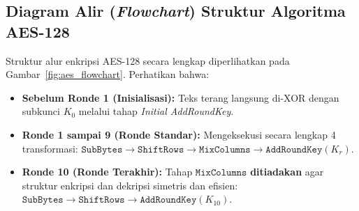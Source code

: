 \documentclass[11pt,a4paper]{article}
\begin{document}
\subsection{Diagram Alir (\textit{Flowchart}) Struktur Algoritma AES-128}
Struktur alur enkripsi AES-128 secara lengkap diperlihatkan pada Gambar~\ref{fig:aes_flowchart}. Perhatikan bahwa:
\begin{itemize}[leftmargin=*]
    \item \textbf{Sebelum Ronde 1 (Inisialisasi):} Teks terang langsung di-XOR dengan subkunci $K_0$ melalui tahap \textit{Initial AddRoundKey}.
    \item \textbf{Ronde 1 sampai 9 (Ronde Standar):} Mengeksekusi secara lengkap 4 transformasi: $\mathtt{SubBytes} \to \mathtt{ShiftRows} \to \mathtt{MixColumns} \to \mathtt{AddRoundKey}(K_r)$.
    \item \textbf{Ronde 10 (Ronde Terakhir):} Tahap $\mathtt{MixColumns}$ \textbf{ditiadakan} agar struktur enkripsi dan dekripsi simetris dan efisien: $\mathtt{SubBytes} \to \mathtt{ShiftRows} \to \mathtt{AddRoundKey}(K_{10})$.
\end{itemize}
\end{document}
